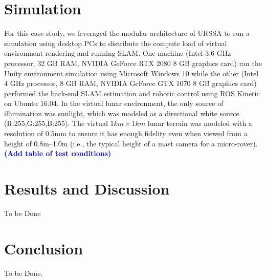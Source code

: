 \documentclass[a4paper, 10pt, conference]{ieeeconf}      %
\newcommand\coltxt[2]{\textbf{\textcolor{#1}{(#2)}}}
\newcommand\msm[1]{\coltxt{blue}{#1}}
\begin{document}
\section{Simulation }
For this case study, we leveraged the modular architecture of URSSA to run a simulation using desktop PCs to distribute the compute load of virtual environment rendering and running SLAM. One machine (Intel 3.6 GHz processor, 32 GB RAM, NVIDIA GeForce RTX 2080 8 GB graphics card) ran the Unity environment simulation using Microsoft Windows 10 while the other (Intel 4 GHz processor, 8 GB RAM, NVIDIA GeForce GTX 1070 8 GB graphics card) performed the back-end SLAM estimation and robotic control using ROS Kinetic on Ubuntu 16.04. In the virtual lunar environment, the only source of illumination was sunlight, which was modeled as a directional white source (R:255,G:255,B:255). The virtual $1km\times 1km$ lunar terrain was modeled with a resolution of 0.5mm to ensure it has enough fidelity even when viewed from a height of 0.8m--1.0m (i.e., the typical height of a mast camera for a micro-rover).\msm{Add table of test conditions}
\section{Results and Discussion}
To be Done
\section{Conclusion}
To be Done.



\end{document}
